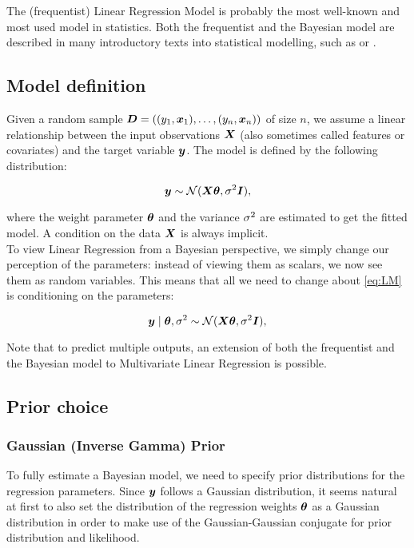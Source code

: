 
The (frequentist) Linear Regression Model is probably the most well-known and most used model in statistics. Both the frequentist and the Bayesian model are described in many introductory texts into statistical modelling, such as \citep{fahrmeir_regression_2021} or \citep{gelman_bayesian_2013}.

\subsection{Model definition}

Given a random sample $\bm{D} = ((y_1, \bm{x}_1), \dots, (y_n, \bm{x}_n))$ of size $n$, we assume a linear relationship between the input observations $\bm{X}$ (also sometimes called features or covariates) and the target variable $\bm{y}$. The model is defined by the following distribution: 

\begin{equation} \label{eq:LM}
    \bm{y} \sim \mathcal{N}(\bm{X} \bm{\theta}, \sigma^2 \bm{I}),
\end{equation}

where the weight parameter $\bm{\theta}$ and the variance $\sigma^2$ are estimated to get the fitted model.
A condition on the data $\bm{X}$ is always implicit. \\

To view Linear Regression from a Bayesian perspective, we simply change our perception of the parameters: instead of viewing them as scalars, we now see them as random variables.
This means that all we need to change about \eqref{eq:LM} is conditioning on the parameters:

\begin{equation} \label{eq:BLM}
    \bm{y} \mid \bm{\theta}, \sigma^2 \sim \mathcal{N}(\bm{X} \bm{\theta}, \sigma^2 \bm{I}), 
\end{equation}


Note that to predict multiple outputs, an extension of both the frequentist and the Bayesian model to Multivariate Linear Regression is possible.

\subsection{Prior choice}
\subsubsection*{Gaussian (Inverse Gamma) Prior}

To fully estimate a Bayesian model, we need to specify prior distributions for the regression parameters. 
Since $\bm{y}$ follows a Gaussian distribution, it seems natural at first to also set the distribution of the regression weights $\bm{\theta}$ as a Gaussian distribution in order to make use of the Gaussian-Gaussian conjugate for prior distribution and likelihood.


